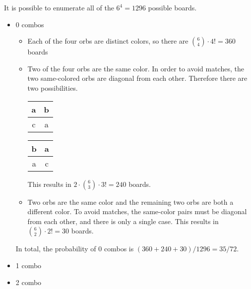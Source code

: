 \documentclass[12pt]{article}
\begin{document}
It is possible to enumerate all of the $6^4=1296$ possible boards.
\begin{itemize}
    \item 0 combos
    \begin{itemize}
        \item Each of the four orbs are distinct colors, so there are $\binom{6}{4}\cdot 4!=360$ boards
        \item Two of the four orbs are the same color. In order to avoid matches, the two same-colored orbs are diagonal from each other. Therefore there are two possibilities.
        \begin{center}
            \begin{tabular}{|c|c|}
            \hline
            a & b \\
            \hline
            c & a \\
            \hline
            \end{tabular}
            \qquad
            \begin{tabular}{|c|c|}
            \hline
            b & a \\
            \hline
            a & c \\
            \hline
            \end{tabular}
        \end{center}
        This results in $2\cdot\binom{6}{3}\cdot 3!=240$ boards.
        \item Two orbs are the same color and the remaining two orbs are both a different color. To avoid matches, the same-color pairs must be diagonal from each other, and there is only a single case. This results in $\binom{6}{2}\cdot 2!=30$ boards.
    \end{itemize}
    In total, the probability of 0 combos is $(360+240+30)/1296=35/72$.
    \item 1 combo
    
    \item 2 combo
    
\end{itemize}
\end{document}
